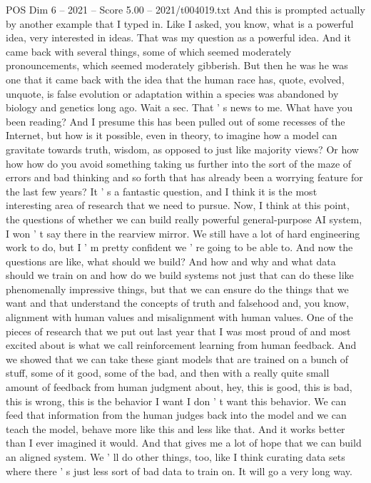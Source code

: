 \begin{textsample}{POS Dim 6 – 2021 – Score 5.00 – 2021/t004019.txt}
And this is prompted actually by another example that I typed in.
Like I asked, you know, what is a powerful idea, very interested in ideas.
That was my question as a powerful idea.
And it came back with several things, some of which seemed moderately pronouncements, which seemed moderately gibberish.
But then he was he was one that it came back with the idea that the human race has, quote, evolved, unquote, is false evolution or adaptation within a species was abandoned by biology and genetics long ago.
Wait a sec.
That ' s news to me.
What have you been reading?
And I presume this has been pulled out of some recesses of the Internet, but how is it possible, even in theory, to imagine how a model can gravitate towards truth, wisdom, as opposed to just like majority views?
Or how how how do you avoid something taking us further into the sort of the maze of errors and bad thinking and so forth that has already been a worrying feature for the last few years?
It ' s a fantastic question, and I think it is the most interesting area of research that we need to pursue.
Now, I think at this point, the questions of whether we can build really powerful general-purpose AI system, I won ' t say there in the rearview mirror.
We still have a lot of hard engineering work to do, but I ' m pretty confident we ' re going to be able to.
And now the questions are like, what should we build?
And how and why and what data should we train on and how do we build systems not just that can do these like phenomenally impressive things, but that we can ensure do the things that we want and that understand the concepts of truth and falsehood and, you know, alignment with human values and misalignment with human values.
One of the pieces of research that we put out last year that I was most proud of and most excited about is what we call reinforcement learning from human feedback.
And we showed that we can take these giant models that are trained on a bunch of stuff, some of it good, some of the bad, and then with a really quite small amount of feedback from human judgment about, hey, this is good, this is bad, this is wrong, this is the behavior I want I don ' t want this behavior.
We can feed that information from the human judges back into the model and we can teach the model, behave more like this and less like that.
And it works better than I ever imagined it would.
And that gives me a lot of hope that we can build an aligned system.
We ' ll do other things, too, like I think curating data sets where there ' s just less sort of bad data to train on.
It will go a very long way.

\end{textsample}
